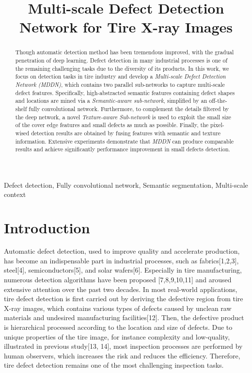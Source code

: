 \documentclass{article}
\title{Multi-scale Defect Detection Network for Tire X-ray Images}
\begin{document}

\maketitle

\begin{abstract}
Though automatic detection method has been tremendous improved, with the gradual penetration of deep learning. Defect detection in many industrial processes is one of the remaining challenging tasks due to the diversity of its products. In this work, we focus on detection tasks in tire industry and develop a {\it Multi-scale Defect Detection Network (MDDN)}, which contains two parallel sub-networks to capture multi-scale defect features. Specifically, high-abstracted semantic features containing defect shapes and locations are mined via a {\it Semantic-aware sub-network}, simplified by an off-the-shelf fully convolutional network. Furthermore, to complement the details filtered by the deep network, a novel {\it Texture-aware Sub-network} is used to exploit the small size of the cover edge features and small defects as much as possible. Finally, the pixel-wised detection results are obtained by fusing features with semantic and texture information. Extensive experiments demonstrate that {\it MDDN} can produce comparable results and achieve significantly performance improvement in small defects detection.
\end{abstract}

\begin{keywords}
Defect detection, Fully convolutional network, Semantic segmentation, Multi-scale context
\end{keywords}

\section{Introduction}
\label{sec:intro}
Automatic defect detection, used to improve quality and accelerate production, has become an indispensable part in industrial processes, such as fabrics[1,2,3], steel[4], semiconductors[5], and solar wafers[6]. Especially in tire manufacturing, numerous detection algorithms have been proposed [7,8,9,10,11] and aroused extensive attention over the past two decades. In most real-world applications, tire defect detection is first carried out by deriving the defective region from tire X-ray images, which contains various types of defects caused by unclean raw materials and undesired manufacturing facilities[12]. Then, the defective product is hierarchical processed according to the location and size of defects. Due to unique properties of the tire image, for instance complexity and low-quality, illustrated in previous study[13, 14], most inspection processes are performed by human observers, which increases the risk and reduces the efficiency. Therefore, tire defect detection remains one of the most challenging inspection tasks.
\end{document}
